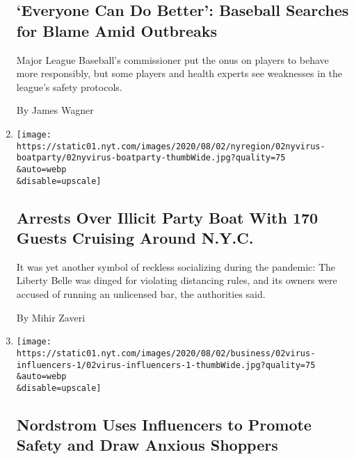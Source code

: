 \begin{enumerate}
  \hypertarget{everyone-can-do-better-baseball-searches-for-blame-amid-outbreaks}{%
  \subsection{`Everyone Can Do Better': Baseball Searches for Blame Amid
  Outbreaks}\label{everyone-can-do-better-baseball-searches-for-blame-amid-outbreaks}}

  Major League Baseball's commissioner put the onus on players to behave
  more responsibly, but some players and health experts see weaknesses
  in the league's safety protocols.

  By James Wagner
\item
  \href{/2020/08/02/nyregion/liberty-belle-illegal-party.html}{}

  \texttt{[image: https://static01.nyt.com/images/2020/08/02/nyregion/02nyvirus-boatparty/02nyvirus-boatparty-thumbWide.jpg?quality=75\\\&auto=webp\\\&disable=upscale]}

  \hypertarget{arrests-over-illicit-party-boat-with-170-guests-cruising-around-nyc}{%
  \subsection{Arrests Over Illicit Party Boat With 170 Guests Cruising
  Around
  N.Y.C.}\label{arrests-over-illicit-party-boat-with-170-guests-cruising-around-nyc}}

  It was yet another symbol of reckless socializing during the pandemic:
  The Liberty Belle was dinged for violating distancing rules, and its
  owners were accused of running an unlicensed bar, the authorities
  said.

  By Mihir Zaveri
\item
  \href{/2020/08/02/business/media/coronavirus-nordstrom-infuencers.html}{}

  \texttt{[image: https://static01.nyt.com/images/2020/08/02/business/02virus-influencers-1/02virus-influencers-1-thumbWide.jpg?quality=75\\\&auto=webp\\\&disable=upscale]}

  \hypertarget{nordstrom-uses-influencers-to-promote-safety-and-draw-anxious-shoppers}{%
  \subsection{Nordstrom Uses Influencers to Promote Safety and Draw
  Anxious
  Shoppers}\label{nordstrom-uses-influencers-to-promote-safety-and-draw-anxious-shoppers}}


\end{enumerate}

